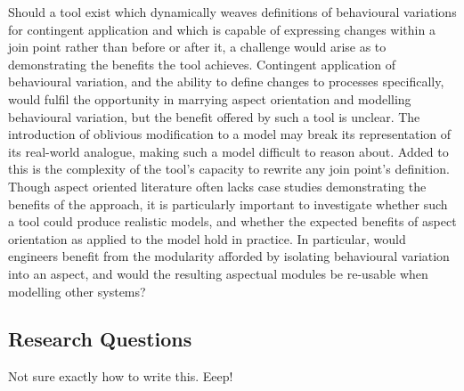 Should a tool exist which dynamically weaves definitions of behavioural
variations for contingent application and which is capable of expressing changes
within a join point rather than before or after it, a challenge would arise as
to demonstrating the benefits the tool achieves. Contingent application of
behavioural variation, and the ability to define changes to processes
specifically, would fulfil the opportunity in marrying aspect orientation and
modelling behavioural variation, but the benefit offered by such a tool is
unclear. The introduction of oblivious modification to a model may break its
representation of its real-world analogue, making such a model difficult to
reason about. Added to this is the complexity of the tool's capacity to rewrite
any join point's definition. Though aspect oriented literature often lacks case
studies demonstrating the benefits of the approach, it is particularly important
to investigate whether such a tool could produce realistic models, and whether
the expected benefits of aspect orientation as applied to the model hold in
practice. In particular, would engineers benefit from the modularity afforded
by isolating behavioural variation into an aspect, and would the resulting
aspectual modules be re-usable when modelling other systems?



\subsection{Research Questions}\label{subsec:rqs}

Not sure exactly how to write this. Eeep!


